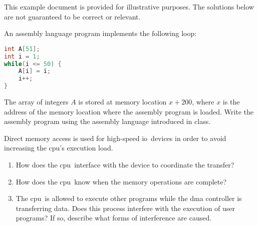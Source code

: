 \documentclass[gantt]{brandeis-problemset}
\author{Rebecca Turner}
\newcommand{\io}{\ac{io}}
\newcommand{\cpu}{\ac{cpu}}
\begin{document}
 This example document is provided for illustrative purposes. The
solutions below are not guaranteed to be correct or relevant.

\begin{problem}
	An assembly language program implements the following loop:

\begin{lstlisting}[language=c]
int A[51];
int i = 1;
while(i <= 50) {
	A[i] = i;
	i++;
}
\end{lstlisting}

	The array of integers $A$ is stored at memory location $x + 200$,
	where $x$ is the address of the memory location where the assembly
	program is loaded. Write the assembly program using the assembly
	language introduced in class.
\end{problem}


\begin{problem}[number=1.11]
	Direct memory access is used for high-speed \io\ devices in order to
	avoid increasing the \cpu's execution load.

	\begin{enumerate}
		\item How does the \cpu\ interface with the device to
			coordinate the transfer?
		\item How does the \cpu\ know when the memory operations are
			complete?
		\item The \cpu\ is allowed to execute other programs while
			the \ac{dma} controller is transferring data. Does
			this process interfere with the execution of user
			programs? If so, describe what forms of interference
			are caused.
	\end{enumerate}
\end{problem}
\end{document}
